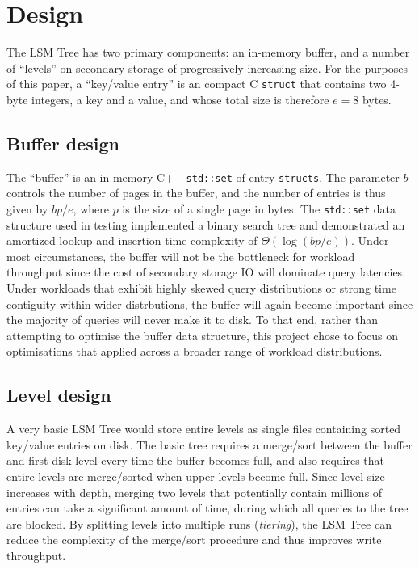 \documentclass{acm}
\begin{document}
\section{Design}

The LSM Tree has two primary components: an in-memory buffer, and a number of ``levels'' on secondary storage of progressively increasing size. For the purposes of this paper, a ``key/value entry'' is an compact C \texttt{struct} that contains two 4-byte integers, a key and a value, and whose total size is therefore $e=8$ bytes.

\subsection{Buffer design}

The ``buffer'' is an in-memory C++ \texttt{std::set} of entry \texttt{structs}. The parameter $b$ controls the number of pages in the buffer, and the number of entries is thus given by $bp/e$, where $p$ is the size of a single page in bytes. The \texttt{std::set} data structure used in testing implemented a binary search tree and demonstrated an amortized lookup and insertion time complexity of $\Theta(\log(bp/e))$. Under most circumstances, the buffer will not be the bottleneck for workload throughput since the cost of secondary storage IO will dominate query latencies. Under workloads that exhibit highly skewed query distributions or strong time contiguity within wider distrbutions, the buffer will again become important since the majority of queries will never make it to disk. To that end, rather than attempting to optimise the buffer data structure, this project chose to focus on optimisations that applied across a broader range of workload distributions.

\subsection{Level design}

A very basic LSM Tree would store entire levels as single files containing sorted key/value entries on disk. The basic tree requires a merge/sort between the buffer and first disk level every time the buffer becomes full, and also requires that entire levels are merge/sorted when upper levels become full. Since level size increases with depth, merging two levels that potentially contain millions of entries can take a significant amount of time, during which all queries to the tree are blocked. By splitting levels into multiple runs (\textit{tiering}), the LSM Tree can reduce the complexity of the merge/sort procedure and thus improves write throughput.
\end{document}
